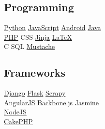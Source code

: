 \documentclass[]{joaosoares-resume}
\begin{document}
\begin{minipage}[t]{0.35\textwidth}
\subsection{Programming}
\href{http://www.python.org}{Python} \textbullet{}
\href{http://www.php.net}{JavaScript} \textbullet{}
\href{http://android.com}{Android} \textbullet{}
\href{https://www.oracle.com/java/}{Java}\\
\href{http://www.php.net}{PHP} \textbullet{}
CSS \textbullet{}
\href{http://jinja.pocoo.org/}{Jinja} \textbullet{}
\href{http://www.latex-project.org}{\LaTeX} \\
C \textbullet{}
SQL \textbullet{}
\href{https://mustache.github.io/}{Mustache}\\
\sectionsep

\subsection{Frameworks}
\href{https://www.djangoproject.com/}{Django} \textbullet{}
\href{http://flask.pocoo.org/}{Flask} \textbullet{}
\href{https://scrapy.org/}{Scrapy} \\
\href{https://angularjs.org}{AngularJS} \textbullet{}
\href{https://backbonejs.org/}{Backbone.js} \textbullet{}
\href{https://jasmine.github.io/}{Jasmine} \\
\href{https://nodejs.org/en/}{NodeJS} \\
\href{https://cakephp.org/}{CakePHP} \\
\sectionsep


\end{minipage}
\end{document}
